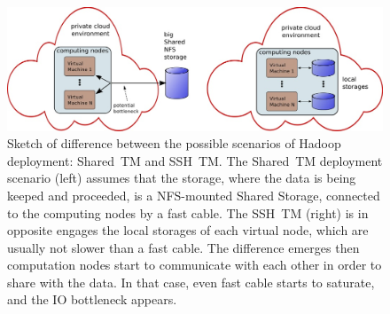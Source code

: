 \documentclass{article}
\begin{document}
\begin{center}
	\begin{figure}[htbp] %
	   \includegraphics[width=13cm]{fig3.jpg} 
	   \caption{Sketch of difference between the possible scenarios of Hadoop deployment: Shared~TM and SSH~TM. The Shared~TM deployment scenario (left) assumes that the storage, where the data is being keeped and proceeded, is a NFS-mounted Shared Storage, connected to the computing nodes by a fast cable. The SSH~TM (right) is in opposite engages the local storages of each virtual node, which are usually not slower than a fast cable. The difference emerges then computation nodes start to communicate with each other in order to share with the data. In that case, even fast cable starts to saturate, and the IO bottleneck appears.}
	   \label{fig:fig3}
	\end{figure}
\end{center}
\end{document}
